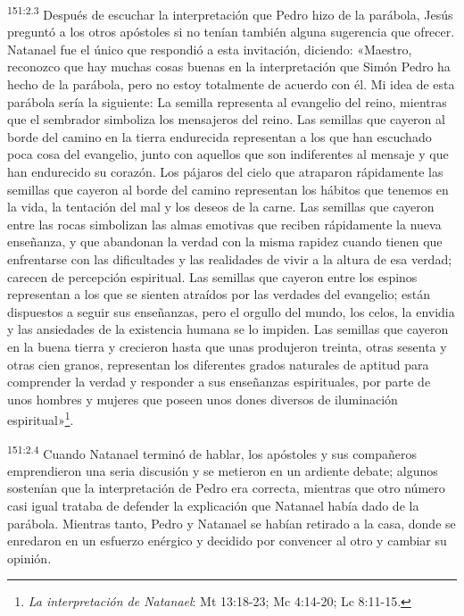 \par 
\textsuperscript{151:2.3} Después de escuchar la interpretación que Pedro hizo de la parábola, Jesús preguntó a los otros apóstoles si no tenían también alguna sugerencia que ofrecer. Natanael fue el único que respondió a esta invitación, diciendo: «Maestro, reconozco que hay muchas cosas buenas en la interpretación que Simón Pedro ha hecho de la parábola, pero no estoy totalmente de acuerdo con él. Mi idea de esta parábola sería la siguiente: La semilla representa al evangelio del reino, mientras que el sembrador simboliza los mensajeros del reino. Las semillas que cayeron al borde del camino en la tierra endurecida representan a los que han escuchado poca cosa del evangelio, junto con aquellos que son indiferentes al mensaje y que han endurecido su corazón. Los pájaros del cielo que atraparon rápidamente las semillas que cayeron al borde del camino representan los hábitos que tenemos en la vida, la tentación del mal y los deseos de la carne. Las semillas que cayeron entre las rocas simbolizan las almas emotivas que reciben rápidamente la nueva enseñanza, y que abandonan la verdad con la misma rapidez cuando tienen que enfrentarse con las dificultades y las realidades de vivir a la altura de esa verdad; carecen de percepción espiritual. Las semillas que cayeron entre los espinos representan a los que se sienten atraídos por las verdades del evangelio; están dispuestos a seguir sus enseñanzas, pero el orgullo del mundo, los celos, la envidia y las ansiedades de la existencia humana se lo impiden. Las semillas que cayeron en la buena tierra y crecieron hasta que unas produjeron treinta, otras sesenta y otras cien granos, representan los diferentes grados naturales de aptitud para comprender la verdad y responder a sus enseñanzas espirituales, por parte de unos hombres y mujeres que poseen unos dones diversos de iluminación espiritual»\footnote{\textit{La interpretación de Natanael}: Mt 13:18-23; Mc 4:14-20; Lc 8:11-15.}.

\par 
\textsuperscript{151:2.4} Cuando Natanael terminó de hablar, los apóstoles y sus compañeros emprendieron una seria discusión y se metieron en un ardiente debate; algunos sostenían que la interpretación de Pedro era correcta, mientras que otro número casi igual trataba de defender la explicación que Natanael había dado de la parábola. Mientras tanto, Pedro y Natanael se habían retirado a la casa, donde se enredaron en un esfuerzo enérgico y decidido por convencer al otro y cambiar su opinión.

